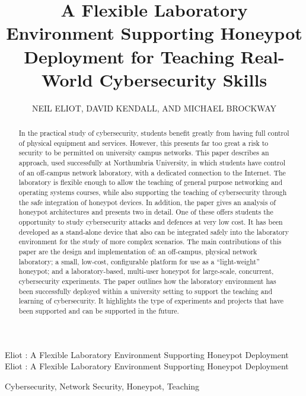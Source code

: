 \documentclass{ieeeaccess}
\begin{document}
  
  \title{A Flexible Laboratory Environment Supporting Honeypot Deployment for Teaching Real-World Cybersecurity Skills}
  \author{\uppercase{Neil Eliot},
  \uppercase{David Kendall, and Michael Brockway}}
  \address[1]{Northumbria University, Department of Computing and Information Sciences, 
  Newcastle upon Tyne, NE1 8ST}
  
  \markboth
  {Eliot \headeretal: A Flexible Laboratory Environment Supporting Honeypot Deployment}
  {Eliot \headeretal: A Flexible Laboratory Environment Supporting Honeypot Deployment}
  
  
\begin{abstract}
  In the practical study of cybersecurity, students benefit greatly from having
  full control of physical equipment and services. However, this presents far
  too great a risk to security to be permitted on university campus networks.
  This paper describes an approach, used successfully at
  Northumbria University, in which students have control of an off-campus
  network laboratory, with a dedicated connection to the Internet.  The
  laboratory is flexible enough to allow the teaching of general purpose
  networking and operating systems courses, while also supporting the teaching of cybersecurity through the safe integration of
  honeypot devices. In addition, the paper 
  gives an analysis of honeypot architectures and presents two in detail. One
  of these offers students the opportunity to study cybersecurity attacks and
  defences at very low cost.  It has been developed as a stand-alone device that
  also can be integrated safely into the laboratory environment for the study
  of more complex scenarios.  The main contributions of this paper are the
  design and implementation of: an off-campus, physical network laboratory; a
  small, low-cost, configurable platform for use as a ``light-weight''
  honeypot; and a laboratory-based, multi-user honeypot for large-scale,
  concurrent, cybersecurity experiments.  The paper outlines how
  the laboratory environment has been successfully deployed within a university setting to
  support the teaching and learning of cybersecurity. It highlights the type of
  experiments and projects that have been supported and can be 
  supported in the future.
\end{abstract}
\begin{IEEEkeywords}
  Cybersecurity, Network Security, Honeypot, Teaching
\end{IEEEkeywords}
\titlepgskip=-15pt
\maketitle
\end{document}
